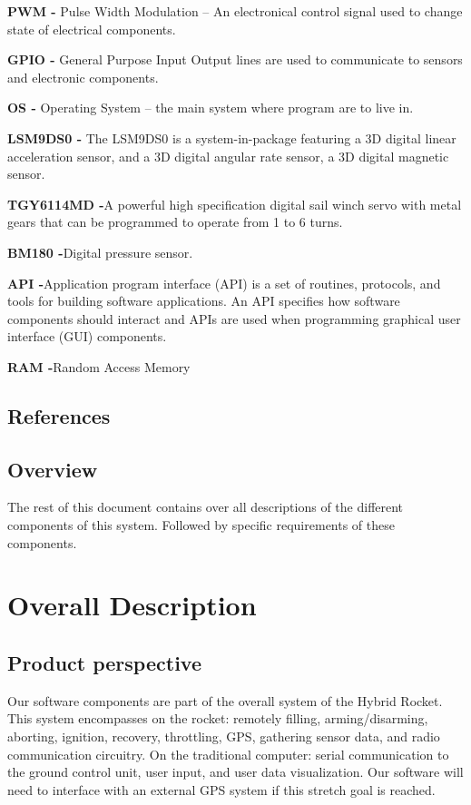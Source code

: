 \documentclass[10pt,draftclsnofoot,onecolumn,compsoc]{IEEEtran}
\begin{document}
{\bf PWM -} Pulse Width Modulation – An electronical control signal used to change state of electrical components.\par
{\bf GPIO -}  General Purpose Input Output lines are used to communicate to sensors and electronic components.\par
{\bf OS -} Operating System – the main system where program are to live in.\par
{\bf LSM9DS0 -} The LSM9DS0 is a system-in-package featuring a 3D digital linear acceleration sensor, and a 3D digital angular rate sensor, a 3D digital magnetic sensor.\par
{\bf TGY6114MD -}A powerful high specification digital sail winch servo with metal gears that can be programmed to operate from 1 to 6 turns.\par
{\bf BM180 -}Digital pressure sensor.\par
{\bf API -}Application program interface (API) is a set of routines, protocols, and tools for building software applications. An API specifies how software components should interact and APIs are used when programming graphical user interface (GUI) components.\par
{\bf RAM -}Random Access Memory\par

\subsection{ References}
\subsection{Overview}
The rest of this document contains over all descriptions of the different components of this system. Followed by specific requirements of these components.

\section{ Overall Description}
\subsection{ Product perspective}
Our software components are part of the overall system of the Hybrid Rocket. This system encompasses on the rocket: remotely filling, arming/disarming, aborting, ignition, recovery, throttling, GPS, gathering sensor data, and radio communication circuitry.  On the traditional computer: serial communication to the ground control unit, user input, and user data visualization. Our software will need to interface with an external GPS system if this stretch goal is reached. 
\end{document}
